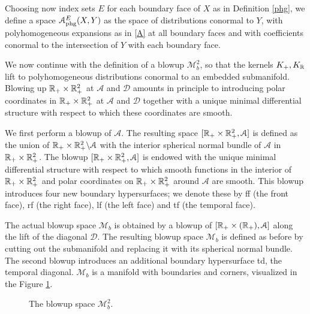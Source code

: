 Choosing now index sets $E$ for each boundary face of $X$ as in Definition 
\ref{phg}, we define a space $\mathscr{A}_{\textup{phg}}^E(X,Y)$
as the space of distributions conormal to $Y$, with
polyhomogeneous expansions as in \eqref{A} at all boundary faces and 
with coefficients conormal to the intersection of $Y$ with each boundary face. 

We now continue with the definition of a blowup $\mathscr{M}^2_b$, so that 
the kernels $K_+,K_\R$ lift to polyhomogeneous distributions conormal 
to an embedded submanifold. Blowing up $\R_+\times \R_+^2$ at $\mathscr{A}$ and $\mathscr{D}$
amounts in principle to introducing polar coordinates in $\R_+\times \R_+^2$ 
at $\mathscr{A}$ and $\mathscr{D}$ together with a unique minimal differential 
structure with respect to which these coordinates are smooth.

We first perform a blowup of $\mathscr{A}$.
The resulting space $[\R_+\times \R_+^2, \mathscr{A}]$ is defined as the union of
$\R_+\times \R_+^2 \backslash \mathscr{A}$ with the interior spherical normal bundle of 
$\mathscr{A}$ in $\R_+\times \R_+^2$. The blowup $[\R_+\times \R_+^2, \mathscr{A}]$ 
is endowed with the unique minimal differential structure with respect to which smooth 
functions in the interior of $\R_+\times \R_+^2$ and polar coordinates on $\R_+\times \R_+^2$ 
around $\mathscr{A}$ are smooth. This blowup introduces four new boundary hypersurfaces;  
we denote these by ff (the front face), rf (the right face), lf (the left face) and tf (the temporal face).  

The actual blowup space $\mathcal{M}_b$ is obtained by a blowup of 
$[\R_+\times (\R_+), \mathscr{A}]$ along the lift of the diagonal $\mathscr{D}$. 
The resulting blowup space $\mathcal{M}_b$ is defined as before by cutting out 
the submanifold and replacing it with its spherical normal bundle. The second 
blowup introduces an additional boundary hypersurface td, the temporal diagonal. 
$\mathcal{M}_b$ is a manifold with boundaries and corners, visualized in the Figure \ref{blowup}.


\begin{figure}[h]
\begin{center}
\end{center}
\label{blowup}
\caption{The blowup space $\mathscr{M}^2_b$.}
\end{figure}

